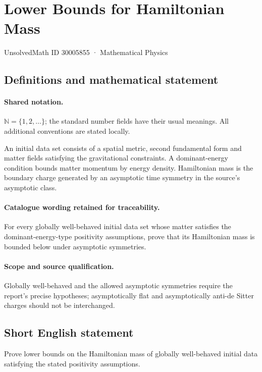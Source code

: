 \documentclass[11pt]{article}
\begin{document}
\setcounter{section}{30005854}
\section{Lower Bounds for Hamiltonian Mass}\label{30005855}
{\small UnsolvedMath ID 30005855 · Mathematical Physics}
\subsection{Definitions and mathematical statement}

\paragraph{Shared notation.}$\mathbb N=\{1,2,\ldots\}$; the standard number fields have their usual meanings. All additional conventions are stated locally.


An initial data set consists of a spatial metric, second fundamental form and matter fields satisfying the gravitational constraints. A dominant-energy condition bounds matter momentum by energy density. Hamiltonian mass is the boundary charge generated by an asymptotic time symmetry in the source's asymptotic class.

\paragraph{Catalogue wording retained for traceability.}
For every globally well-behaved initial data set whose matter satisfies the dominant-energy-type positivity assumptions, prove that its Hamiltonian mass is bounded below under asymptotic symmetries.

\paragraph{Scope and source qualification.}Globally well-behaved and the allowed asymptotic symmetries require the report's precise hypotheses; asymptotically flat and asymptotically anti-de Sitter charges should not be interchanged.
\subsection{Short English statement}
Prove lower bounds on the Hamiltonian mass of globally well-behaved initial data satisfying the stated positivity assumptions.
\end{document}

